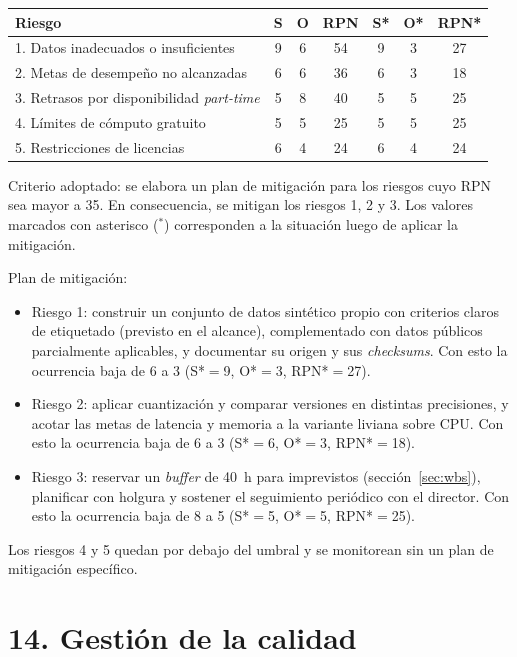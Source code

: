 \documentclass[
11pt, %
]{charter}
\begin{document}
\begin{table}[htpb]
\centering
\begin{tabularx}{\linewidth}{@{}|X|c|c|c|c|c|c|@{}}
\hline
\rowcolor[HTML]{C0C0C0}
Riesgo & S & O & RPN & S* & O* & RPN* \\ \hline
1. Datos inadecuados o insuficientes & 9 & 6 & 54 & 9 & 3 & 27 \\ \hline
2. Metas de desempeño no alcanzadas & 6 & 6 & 36 & 6 & 3 & 18 \\ \hline
3. Retrasos por disponibilidad \textit{part-time} & 5 & 8 & 40 & 5 & 5 & 25 \\ \hline
4. Límites de cómputo gratuito & 5 & 5 & 25 & 5 & 5 & 25 \\ \hline
5. Restricciones de licencias & 6 & 4 & 24 & 6 & 4 & 24 \\ \hline
\end{tabularx}%
\end{table}

Criterio adoptado: se elabora un plan de mitigación para los riesgos cuyo RPN sea mayor a 35. En consecuencia, se mitigan los riesgos 1, 2 y 3. Los valores marcados con asterisco ($^{*}$) corresponden a la situación luego de aplicar la mitigación.

Plan de mitigación:
\begin{itemize}
	\item Riesgo 1: construir un conjunto de datos sintético propio con criterios claros de etiquetado (previsto en el alcance), complementado con datos públicos parcialmente aplicables, y documentar su origen y sus \textit{checksums}. Con esto la ocurrencia baja de 6 a 3 (S*${}={}$9, O*${}={}$3, RPN*${}={}$27).
	\item Riesgo 2: aplicar cuantización y comparar versiones en distintas precisiones, y acotar las metas de latencia y memoria a la variante liviana sobre CPU. Con esto la ocurrencia baja de 6 a 3 (S*${}={}$6, O*${}={}$3, RPN*${}={}$18).
	\item Riesgo 3: reservar un \textit{buffer} de 40~h para imprevistos (sección~\ref{sec:wbs}), planificar con holgura y sostener el seguimiento periódico con el director. Con esto la ocurrencia baja de 8 a 5 (S*${}={}$5, O*${}={}$5, RPN*${}={}$25).
\end{itemize}

Los riesgos 4 y 5 quedan por debajo del umbral y se monitorean sin un plan de mitigación específico.


\section{14. Gestión de la calidad}
\label{sec:calidad}
\end{document}
